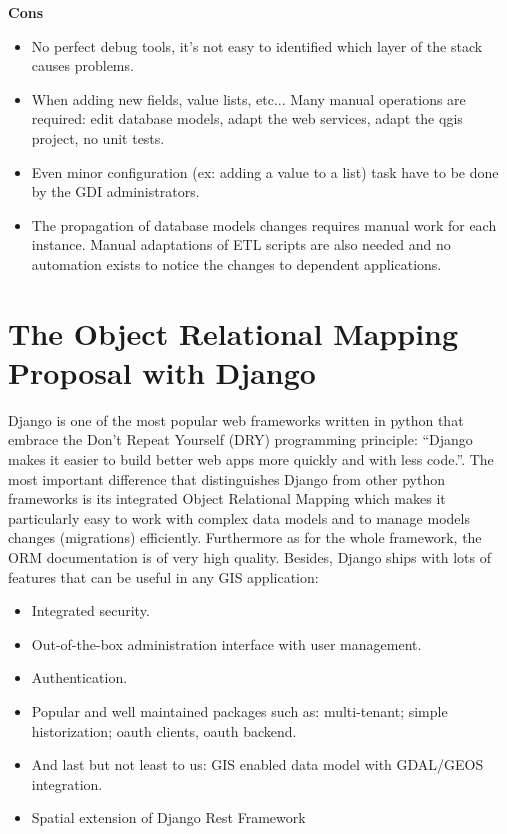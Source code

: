 \documentclass[runningheads]{llncs}
\begin{document}
\textbf{Cons} 
\begin{itemize}
	\item No perfect debug tools, it's not easy to identified which layer of the stack causes problems.
	\item When adding new fields, value lists, etc... Many manual operations are required: edit database models, adapt the web services, adapt the qgis project, no unit tests.
	\item Even minor configuration (ex: adding a value to a list) task have to be done by the GDI administrators.
	\item The propagation of database models changes requires manual work for each instance. Manual adaptations of ETL scripts are also needed and no automation exists to notice the changes to dependent applications.
\end{itemize}


\section{The Object Relational Mapping Proposal with Django}

Django is one of the most popular web frameworks written in python that embrace the Don’t Repeat Yourself (DRY) programming principle: “Django makes it easier to build better web apps more quickly and with less code.”\cite{ref_article5}. The most important difference that distinguishes Django from other python frameworks is its integrated Object Relational Mapping which makes it particularly easy to work with complex data models and to manage models changes (migrations) efficiently. Furthermore as for the whole framework, the ORM documentation is of very high quality. Besides, Django ships with lots of features that can be useful in any GIS application: 

\begin{itemize}
	\item Integrated security.
	\item Out-of-the-box administration interface with user management. 
	\item Authentication.
	\item Popular and well maintained packages such as: multi-tenant; simple historization; oauth clients, oauth backend.
	\item And last but not least to us: GIS enabled data model with GDAL/GEOS integration.
	\item Spatial extension of Django Rest Framework
\end{itemize}
\end{document}

